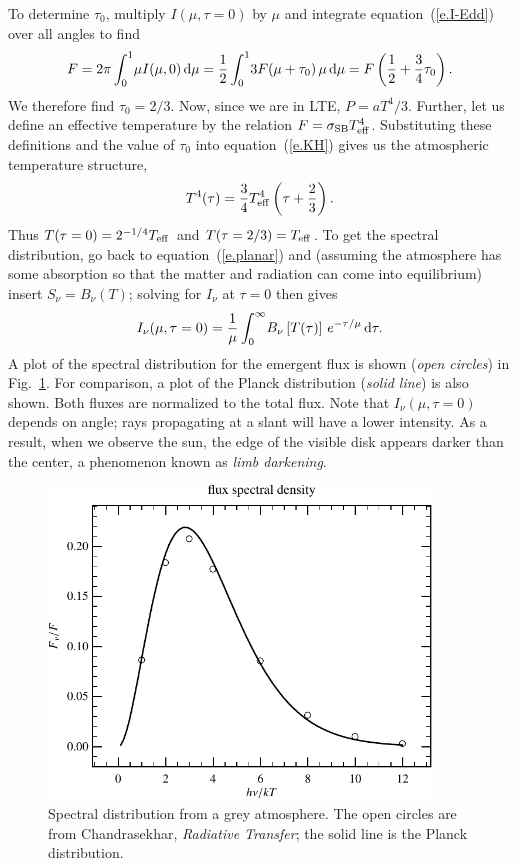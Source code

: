 To determine $\tau_{0}$, multiply $I(\mu,\tau = 0)$ by $\mu$ and integrate equation~(\ref{e.I-Edd}) over all angles to find
\begin{equation}
F = 2\pi\int_{0}^{1}\!\mu I(\mu,0)\,\mathrm{d}\mu = \frac{1}{2}\int_{0}^{1}\!3F(\mu + \tau_{0})\,\mu\,\mathrm{d}\mu = F\left(\frac{1}{2} + \frac{3}{4}\tau_{0}\right).
\end{equation}
We therefore find $\tau_{0} = 2/3$. Now, since we are in LTE, $P = aT^{4}/3$. Further, let us define an effective temperature by the relation $F = \sigma_{\mathrm{SB}}T_{\mathrm{eff}}^{4}$.  Substituting these definitions and the value of $\tau_{0}$ into equation~(\ref{e.KH}) gives us the atmospheric temperature structure,
\begin{equation}\label{e.Eddington}
T^{4}(\tau) = \frac{3}{4}T_{\mathrm{eff}}^{4}\left(\tau + \frac{2}{3}\right).
\end{equation}
Thus $T(\tau  = 0) = 2^{-1/4} T_{\mathrm{eff}}$ and $T(\tau = 2/3) = T_{\mathrm{eff}}$.  To get the spectral distribution, go back to equation~(\ref{e.planar}) and (assuming the atmosphere has some absorption so that the matter and radiation can come into equilibrium) insert $S_{\nu} = B_{\nu}(T)$; solving for $I_{\nu}$ at $\tau = 0$ then gives
\begin{equation}\label{e.spectral}
I_{\nu}(\mu,\tau=0) = \frac{1}{\mu}\int_{0}^{\infty}\!B_{\nu}\left[T(\tau)\right] \, e^{-\tau/\mu}\,\mathrm{d}\tau.
\end{equation}
A plot of the spectral distribution for the emergent flux is shown (\emph{open circles}) in Fig.~\ref{f.spectral}. For comparison, a plot of the Planck distribution (\emph{solid line}) is also shown. Both fluxes are normalized to the total flux.  Note that $I_{\nu}(\mu,\tau=0)$ depends on angle; rays propagating at a slant will have a lower intensity.  As a result, when we observe the sun, the edge of the visible disk appears darker than the center, a phenomenon known as \emph{limb darkening}.

\begin{figure}[htbp]
\includegraphics[width=4in]{plots_out/spectral_distribution}
\caption{\label{f.spectral} Spectral distribution from a grey atmosphere. The open circles are from Chandrasekhar, \emph{Radiative Transfer}; the solid line is the Planck distribution.}
\end{figure}

